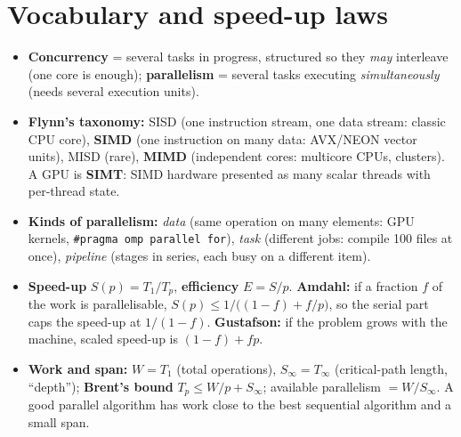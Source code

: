 \documentclass[10pt,a4paper,openany,oneside]{report}
\newcommand{\prio}[1]{\texorpdfstring{\ifcase#1\or{\color{gold}\ding{72}}\or{\color{gold}\ding{72}\ding{72}}\or{\color{gold}\ding{72}\ding{72}\ding{72}}\fi}{}}
\begin{document}
\section{Vocabulary and speed-up laws \prio{2}}
\begin{itemize}[nosep]
\item \textbf{Concurrency} = several tasks in progress, structured so they \emph{may} interleave (one core is enough); \textbf{parallelism} = several tasks executing \emph{simultaneously} (needs several execution units).
\item \textbf{Flynn's taxonomy:} SISD (one instruction stream, one data stream: classic CPU core), \textbf{SIMD} (one instruction on many data: AVX/NEON vector units), MISD (rare), \textbf{MIMD} (independent cores: multicore CPUs, clusters). A GPU is \textbf{SIMT}: SIMD hardware presented as many scalar threads with per-thread state.
\item \textbf{Kinds of parallelism:} \emph{data} (same operation on many elements: GPU kernels, \texttt{\#pragma omp parallel for}), \emph{task} (different jobs: compile 100 files at once), \emph{pipeline} (stages in series, each busy on a different item).
\item \textbf{Speed-up} $S(p)=T_1/T_p$, \textbf{efficiency} $E=S/p$. \textbf{Amdahl:} if a fraction $f$ of the work is parallelisable, $S(p)\le 1/\big((1-f)+f/p\big)$, so the serial part caps the speed-up at $1/(1-f)$. \textbf{Gustafson:} if the problem grows with the machine, scaled speed-up is $(1-f)+fp$.
\item \textbf{Work and span:} $W=T_1$ (total operations), $S_\infty=T_\infty$ (critical-path length, ``depth''); \textbf{Brent's bound} $T_p\le W/p+S_\infty$; available parallelism $=W/S_\infty$. A good parallel algorithm has work close to the best sequential algorithm and a small span.
\end{itemize}
\end{document}
